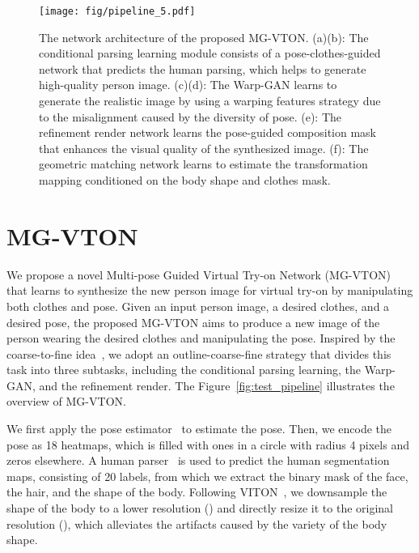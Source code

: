 \documentclass[10pt,twocolumn,letterpaper]{article}
\begin{document}
\begin{figure*}[!ht]
\centering
\texttt{[image: fig/pipeline\_5.pdf]} 
\caption{The network architecture of the proposed MG-VTON. (a)(b): The conditional parsing learning module consists of a pose-clothes-guided network that predicts the human parsing, which helps to generate high-quality person image. (c)(d): The Warp-GAN learns to generate the realistic image by using a warping features strategy due to the misalignment caused by the diversity of pose. (e): The refinement render network learns the pose-guided composition mask that enhances the visual quality of the synthesized image. (f): The geometric matching network learns to estimate the transformation mapping conditioned on the body shape and clothes mask.}
\label{fig:train_pipeline}
\vspace{-4mm}
\end{figure*}

\section{MG-VTON}
We propose a novel Multi-pose Guided Virtual Try-on Network (MG-VTON) that learns to synthesize the new person image for virtual try-on by manipulating both clothes and pose. Given an input person image, a desired clothes, and a desired pose, the proposed MG-VTON aims to produce a new image of the person wearing the desired clothes and manipulating the pose. Inspired by the coarse-to-fine idea~\cite{han2017viton,ma2017pose}, we adopt an outline-coarse-fine strategy that divides this task into three subtasks, including the conditional parsing learning, the Warp-GAN, and the refinement render. The Figure~\ref{fig:test_pipeline} illustrates the overview of MG-VTON. 

We first apply the pose estimator~\cite{cao2017openpose} to estimate the pose. Then, we encode the pose as 18 heatmaps, which is filled with ones in a circle with radius 4 pixels and zeros elsewhere. A human parser~\cite{gong2017look} is used to predict the human segmentation maps, consisting of 20 labels, from which we extract the binary mask of the face, the hair, and the shape of the body. Following VITON~\cite{han2017viton}, we downsample the shape of the body to a lower resolution () and directly resize it to the original resolution  (), which alleviates the artifacts caused by the variety of the body shape.
\end{document}
